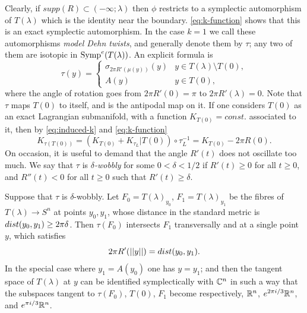 \documentclass[10pt,letterpaper]{article}
\begin{document}
Clearly, if $supp(R) \subset (-\infty;\lambda)$ then $\phi$ restricts to a
symplectic automorphism of $T(\lambda)$ which is the identity near the
boundary. \eqref{eq:k-function} shows that this is an exact symplectic
automorphism. In the case $k = 1$ we call these automorphisms {\em model Dehn
twists}, and generally denote them by $\tau$; any two of them are isotopic in
$\mathrm{Symp}^e(T(\lambda))$. An explicit formula is
\begin{equation} \label{eq:explicit-twist}
\tau(y) =
 \begin{cases}
 \sigma_{2\pi R'(\mu(y))}(y) & y \in T(\lambda) \setminus T(0),\\
 A(y) & y \in T(0),
 \end{cases}
\end{equation}
where the angle of rotation goes from $2\pi R'(0) = \pi$ to $2\pi R'(\lambda) =
0$. Note that $\tau$ maps $T(0)$ to itself, and is the antipodal map on it. If
one considers $T(0)$ as an exact Lagrangian submanifold, with a function
$K_{T(0)} = const.$ associated to it, then by \eqref{eq:induced-k} and
\eqref{eq:k-function}
\begin{equation} \label{eq:self-shift}
K_{\tau(T(0))} = (K_{T(0)} + K_{\tau_L}|T(0)) \circ \tau_L^{-1} = K_{T(0)} -
2\pi R(0).
\end{equation}
On occasion, it is useful to demand that the angle $R'(t)$ does not oscillate
too much. We say that $\tau$ is {\em $\delta$-wobbly} for some $0 < \delta <
1/2$ if $R'(t) \geq 0$ for all $t \geq 0$, and $R''(t) < 0$ for all $t \geq 0$
such that $R'(t) \geq \delta$.

\begin{lemma} \label{th:local-intersections}
Suppose that $\tau$ is $\delta$-wobbly. Let $F_0 = T(\lambda)_{y_0}$, $F_1 =
T(\lambda)_{y_1}$ be the fibres of $T(\lambda) \rightarrow S^n$ at points
$y_0,y_1$, whose distance in the standard metric is ${dist}(y_0,y_1) \geq 2\pi
\delta$. Then $\tau(F_0)$ intersects $F_1$ transversally and at a single point
$y$, which satisfies
\[
2\pi R'(||y||) = {dist}(y_0,y_1).
\]
In the special case where $y_1 = A(y_0)$ one has $y = y_1$; and then the
tangent space of $T(\lambda)$ at $y$ can be identified symplectically with
$\mathbb{C}^n$ in such a way that the subspaces tangent to $\tau(F_0)$, $T(0)$, $F_1$
become respectively, $\mathbb{R}^n$, $e^{2\pi i/3}\mathbb{R}^n$, and $e^{\pi i/3}\mathbb{R}^n$.
\end{lemma}
\end{document}
